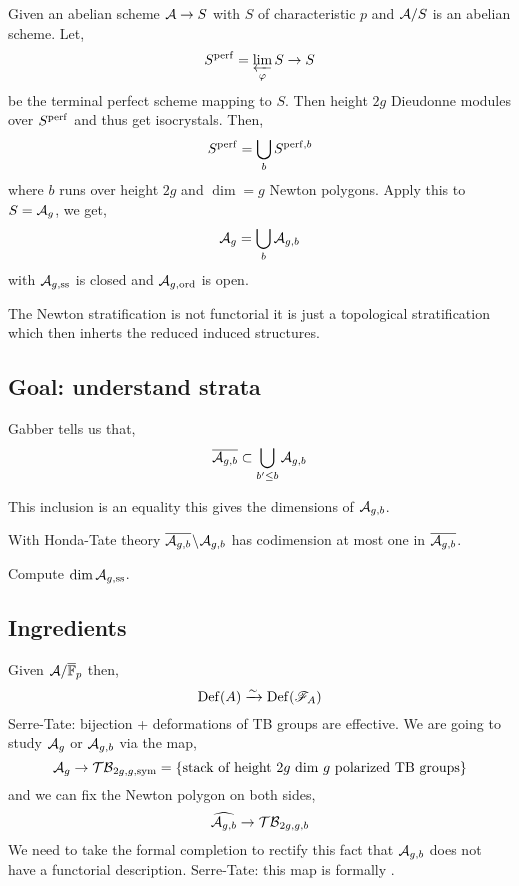 \documentclass[12pt]{article}
\begin{document}
Given an abelian scheme $\mathcal{A} \to S$ with $S$ of characteristic $p$ and $\mathcal{A} / S$ is an abelian scheme. Let,
\[ S^{\mathrm{perf}} = \varprojlim_{\varphi} S \to S \]
be the terminal perfect scheme mapping to $S$. Then height $2g$ Dieudonne modules over $S^{\mathrm{perf}}$ and thus get isocrystals. Then,
\[ S^{\mathrm{perf}} = \bigcup_b S^{\mathrm{perf}, b} \]
where $b$ runs over height $2g$ and $\dim = g$ Newton polygons. Apply this to $S = \mathcal{A}_g$, we get,
\[ \mathcal{A}_g = \bigcup_b \mathcal{A}_{g, b} \]
with $\mathcal{A}_{g, \text{ss}}$ is closed and $\mathcal{A}_{g, \operatorname{\mathrm{ord}}}$ is open. 

\begin{rmk}
The Newton stratification is not functorial it is just a topological stratification which then inherts the reduced induced structures.  
\end{rmk}

\subsection{Goal: understand strata}

\begin{rmk}
Gabber tells us that,
\[ \overline{\mathcal{A}_{g,b}} \subset \bigcup_{b' \le b} \mathcal{A}_{g,b} \]
\end{rmk}

\begin{theorem}
This inclusion is an equality this gives the dimensions of $\mathcal{A}_{g,b}$.
\end{theorem}

\begin{theorem}
With Honda-Tate theory $\overline{\mathcal{A}_{g,b}} \! \setminus \! \mathcal{A}_{g,b}$ has codimension at most one in $\overline{\mathcal{A}_{g,b}}$.
\end{theorem}

\begin{theorem}[Li-Oort]
Compute $\dim{\mathcal{A}_{g, \text{ss}}}$.
\end{theorem}

\subsection{Ingredients}

\newcommand{\TB}{\mathcal{TB}}

Given $\mathcal{A} / \overline{\mathbb{F}}_p$ then,
\[ \mathrm{Def}(A) \xrightarrow{\sim} \mathrm{Def}(\mathscr{F}_A) \]
Serre-Tate: bijection + deformations of TB groups are effective. We are going to study $\mathcal{A}_g$ or $\mathcal{A}_{g,b}$ via the map,
\[ \cA_g \to \TB_{2g,g,\text{sym}} = \{ \text{stack of height } 2 g \text{ dim } g \text{ polarized TB groups} \} \]
and we can fix the Newton polygon on both sides,
\[ \widehat{\cA_{g,b}} \to \TB_{2g, g, b} \]
We need to take the formal completion to rectify this fact that $\mathcal{A}_{g,b}$ does not have a functorial description. Serre-Tate: this map is formally \etale. 
\end{document}

